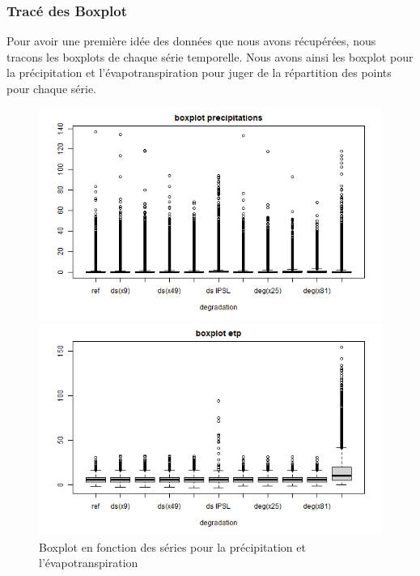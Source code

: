 \documentclass[a4paper,11pt]{article}
\begin{document}
\subsubsection{Tracé des Boxplot}

Pour avoir une première idée des données que nous avons récupérées, nous tracons les boxplots de chaque série temporelle.
Nous avons ainsi les boxplot pour la précipitation et l'évapotranspiration pour juger de la répartition des points pour chaque série.

\begin{figure}[h]
	\begin{minipage}[b]{0.48\linewidth}
		\centering \includegraphics[scale=0.4]{images/boxplot_precip.png}
	\end{minipage}\hfill
	\begin{minipage}[b]{0.48\linewidth}	
		\centering \includegraphics[scale=0.4]{images/boxplot_evap.png}
	\end{minipage}
	\caption{Boxplot en fonction des séries pour la précipitation et l'évapotranspiration}
\end{figure} 
\end{document}
